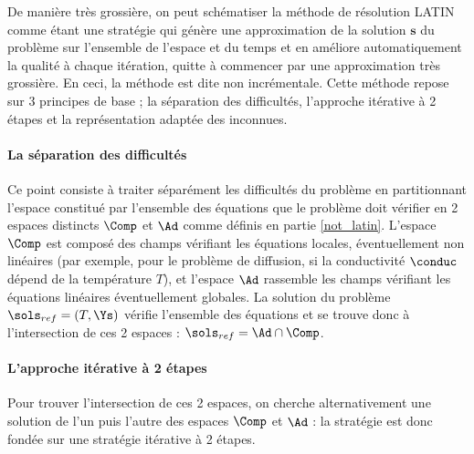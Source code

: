 De manière très grossière, on peut schématiser la méthode de résolution LATIN comme étant une stratégie qui génère une approximation de la solution $\mathbf{s}$ du problème sur l'ensemble de l'espace et du temps et en améliore automatiquement la qualité à chaque itération, quitte à commencer par une approximation très grossière. En ceci, la méthode est dite non incrémentale.
Cette méthode repose sur 3 principes de base ; la séparation des difficultés, l'approche itérative à 2 étapes et la représentation adaptée des inconnues.\\

  \paragraph{La séparation des difficultés }

Ce point consiste à traiter séparément les difficultés du problème en partitionnant l'espace constitué par l'ensemble des équations que le problème doit vérifier en 2 espaces distincts $\Comp$ et $\Ad$ comme définis en partie \ref{not_latin}. L'espace $\Comp$ est composé des champs vérifiant les équations locales, éventuellement non linéaires (par exemple, pour le problème de diffusion, si la conductivité $\conduc$ dépend de la température $T$), et l'espace $\Ad$ rassemble les champs vérifiant les équations linéaires éventuellement globales.
La solution du problème $\sols_{ref}=(T,\Ys)$ vérifie l'ensemble des équations et se trouve donc à l'intersection de ces 2 espaces : $\sols_{ref} = \Ad \cap \Comp$.\\

  \paragraph{L'approche itérative à 2 étapes }

Pour trouver l'intersection de ces 2 espaces, on cherche alternativement une solution de l'un puis l'autre des espaces $\Comp$ et $\Ad$ : la stratégie est donc fondée sur une stratégie itérative à 2 étapes.\\ 


